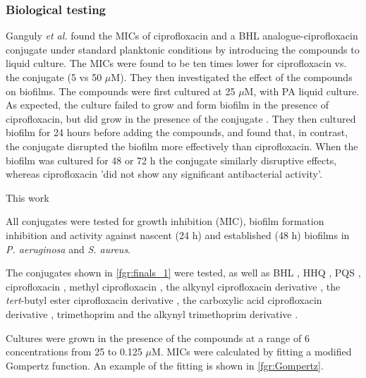 \subsubsection{Biological testing\label{sec:bio2}}


Ganguly \textit{et al.} \cite{Ganguly2011} found the MICs of ciprofloxacin and a BHL analogue-ciprofloxacin conjugate  under standard planktonic conditions by introducing the compounds to liquid culture. The MICs were found to be ten times lower for ciprofloxacin vs. the conjugate  (5 vs 50 $\mu$M). They then investigated the effect of the compounds on biofilms. The compounds were first cultured at 25 $\mu$M, with PA liquid culture. As expected, the culture failed to grow and form biofilm in the presence of ciprofloxacin, but did grow in the presence of the conjugate . They then cultured biofilm for 24 hours before adding the compounds, and found that, in contrast, the conjugate  disrupted the biofilm more effectively than ciprofloxacin. When the biofilm was cultured for 48 or 72 h the conjugate similarly disruptive effects, whereas ciprofloxacin 'did not show any significant antibacterial activity'.

This work 

All conjugates were tested for growth inhibition (MIC), biofilm formation inhibition and activity against nascent (24 h) and established (48 h) biofilms in \textit{P. aeruginosa} and \textit{S. aureus}.

The conjugates shown in \ref{fgr:finals_1} were tested, as well as BHL , HHQ , PQS , ciprofloxacin , methyl ciprofloxacin , the alkynyl ciprofloxacin derivative , the \textit{tert}-butyl ester ciprofloxacin derivative , the carboxylic acid ciprofloxacin derivative , trimethoprim  and the alkynyl trimethoprim derivative .

Cultures were grown in the presence of the compounds at a range of 6 concentrations from 25 to 0.125 $\mu$M. MICs were calculated by fitting a modified Gompertz function\cite{Lambert2016}. An example of the fitting is shown in \ref{fgr:Gompertz}. 

